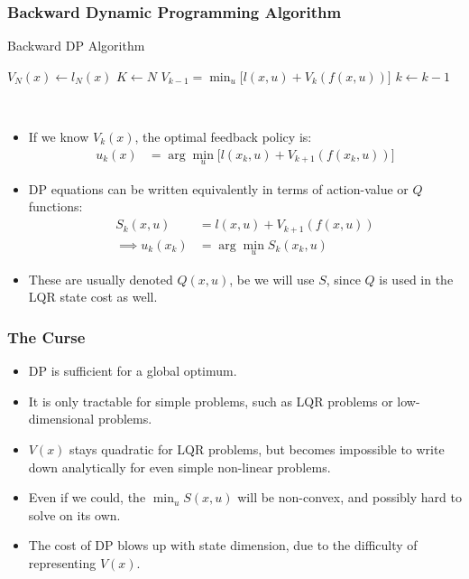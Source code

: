 \subsubsection{Backward Dynamic Programming Algorithm}

\noindent
\begin{algorithm}
	\caption{Backward DP Algorithm}
	\label{alg:bdp}
	\begin{algorithmic}[1]	
        \State $V_N(x) \gets l_N(x)$
        \State $K \gets N$
            \State $V_{k-1} = \min_u \big[ l(x,u) + V_k(f(x,u))\big]$ 
            \State $k \gets k-1$
        \EndWhile
	\end{algorithmic}
\end{algorithm}
\\

\begin{itemize}
    \item If we know $V_k(x)$, the optimal feedback policy is: 
    \begin{align}
        u_{k}(x) &= \arg\min_u \big[ l(x_k,u) + V_{k+1}(f(x_{k},u)) \big]
    \end{align}
    \item DP equations can be written equivalently in terms of action-value or $Q$ functions:
    \begin{align}
        S_k(x,u) &= l(x,u) + V_{k+1} (f(x,u)) \\
        \implies u_k(x_k) &= \arg\min_u S_k(x_k,u)
    \end{align}
    \item These are usually denoted $Q(x,u)$, be we will use $S$, since $Q$ is used in the LQR state cost as well. 
\end{itemize}

\subsubsection{The Curse}
\begin{itemize}
    \item DP is sufficient for a global optimum. 
    \item It is only tractable for simple problems, such as LQR problems or low-dimensional problems. 
    \item $V(x)$ stays quadratic for LQR problems, but becomes impossible to write down analytically for even simple non-linear problems. 
    \item Even if we could, the $\min_u S(x,u)$ will be non-convex, and possibly hard to solve on its own. 
    \item The cost of DP blows up with state dimension, due to the difficulty of representing $V(x)$. 
\end{itemize}

